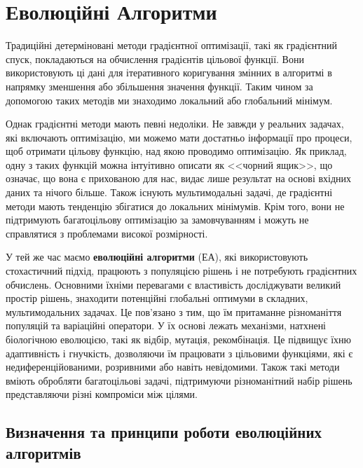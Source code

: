 
\chapter{Еволюційні Алгоритми}
\label{chap:review}  %


Традиційні детерміновані методи градієнтної оптимізації, такі як 
градієнтний спуск, покладаються на обчислення градієнтів цільової функції.
Вони використовують ці дані для ітеративного 
коригування змінних в алгоритмі в напрямку зменшення або збільшення значення функції.
Таким чином за допомогою таких методів ми знаходимо локальний або глобальний мінімум.

Однак градієнтні методи мають певні недоліки.
Не завжди у реальних задачах, які включають оптимізацію, ми можемо мати достатньо
інформації про процеси, щоб отримати цільову функцію, над якою проводимо оптимізацію.
Як приклад, одну з таких функцій можна інтуітивно описати як <<чорний ящик>>, 
що означає, що вона є прихованою для нас, видає лише результат на 
основі вхідних даних та нічого більше.
Також існують мультимодальні задачі, де градієнтні методи мають тенденцію 
збігатися до локальних мінімумів.
Крім того, вони не підтримують багатоцільову оптимізацію за замовчуванням 
і можуть не справлятися з проблемами високої розмірності.

У тей же час маємо \textbf{еволюційні алгоритми} (ЕА), які використовують 
стохастичний підхід, працюють з популяцією рішень і не потребують
градієнтних обчислень.
Основними їхніми перевагами є властивість досліджувати великий простір рішень,
знаходити потенційні глобальні оптимуми в складних, мультимодальних задачах.
Це пов'язано з тим, що їм притаманне різноманіття популяцій
та варіаційні оператори.
У їх основі лежать механізми, натхнені біологічною еволюцією, такі як відбір,
мутація, рекомбінація.
Це підвищує їхню адаптивність і гнучкість, дозволяючи їм працювати з цільовими 
функціями, які є недиференційованими, розривними або навіть невідомими.
Також такі методи вміють обробляти багатоцільові задачі,
підтримуючи різноманітний набір рішень представляючи
різні компроміси між цілями.


\section{Визначення та принципи роботи еволюційних алгоритмів}

